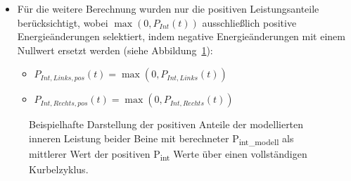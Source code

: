 \documentclass[
  letterpaper,
  DIV=11]{scrartcl}
\providecommand{\tightlist}{%
  \setlength{\itemsep}{0pt}\setlength{\parskip}{0pt}}\usepackage{longtable,booktabs,array}
\begin{document}
\begin{itemize}
\tightlist
\item
  Für die weitere Berechnung wurden nur die positiven Leistungsanteile
  berücksichtigt, wobei \(\max(0, P_{Int}(t))\) ausschließlich positive
  Energieänderungen selektiert, indem negative Energieänderungen mit
  einem Nullwert ersetzt werden (siehe
  Abbildung~\ref{fig-PInt_Modell_Zyklus_positiv}):

  \begin{itemize}
  \tightlist
  \item
    \(P_{Int,Links,pos}(t) = \max(0, P_{Int,Links}(t))\)
  \item
    \(P_{Int,Rechts,pos}(t) = \max(0, P_{Int,Rechts}(t))\)
  \end{itemize}
\end{itemize}

\begin{figure}


\caption{\label{fig-PInt_Modell_Zyklus_positiv}Beispielhafte Darstellung
der positiven Anteile der modellierten inneren Leistung beider Beine mit
berechneter P\textsubscript{int\_modell} als mittlerer Wert der
positiven P\textsubscript{int} Werte über einen vollständigen
Kurbelzyklus.}

\end{figure}%
\end{document}
